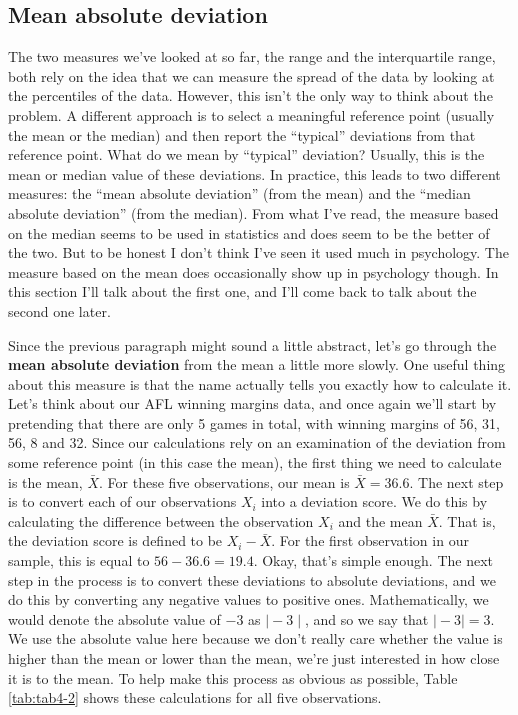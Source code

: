\documentclass[
]{book}
\begin{document}
\hypertarget{mean-absolute-deviation}{%
\subsection{Mean absolute deviation}\label{mean-absolute-deviation}}

The two measures we've looked at so far, the range and the interquartile range, both rely on the idea that we can measure the spread of the data by looking at the percentiles of the data. However, this isn't the only way to think about the problem. A different approach is to select a meaningful reference point (usually the mean or the median) and then report the ``typical'' deviations from that reference point. What do we mean by ``typical'' deviation? Usually, this is the mean or median value of these deviations. In practice, this leads to two different measures: the ``mean absolute deviation'' (from the mean) and the ``median absolute deviation'' (from the median). From what I've read, the measure based on the median seems to be used in statistics and does seem to be the better of the two. But to be honest I don't think I've seen it used much in psychology. The measure based on the mean does occasionally show up in psychology though. In this section I'll talk about the first one, and I'll come back to talk about the second one later.

Since the previous paragraph might sound a little abstract, let's go through the \textbf{mean absolute deviation} from the mean a little more slowly. One useful thing about this measure is that the name actually tells you exactly how to calculate it. Let's think about our AFL winning margins data, and once again we'll start by pretending that there are only 5 games in total, with winning margins of 56, 31, 56, 8 and 32. Since our calculations rely on an examination of the deviation from some reference point (in this case the mean), the first thing we need to calculate is the mean, \(\bar{X}\). For these five observations, our mean is \(\bar{X} = 36.6\). The next step is to convert each of our observations \(X_i\) into a deviation score. We do this by calculating the difference between the observation \(X_i\) and the mean \(\bar{X}\). That is, the deviation score is defined to be \(X_i - \bar{X}\). For the first observation in our sample, this is equal to \(56 - 36.6 = 19.4\). Okay, that's simple enough. The next step in the process is to convert these deviations to absolute deviations, and we do this by converting any negative values to positive ones. Mathematically, we would denote the absolute value of \(-3\) as \(\mid -3 \mid\), and so we say that \(\mid -3 \mid = 3\). We use the absolute value here because we don't really care whether the value is higher than the mean or lower than the mean, we're just interested in how close it is to the mean. To help make this process as obvious as possible, Table \ref{tab:tab4-2} shows these calculations for all five observations.
\end{document}
